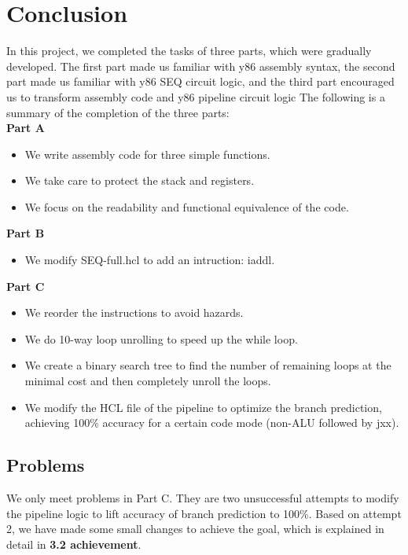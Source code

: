 \documentclass{article}
\begin{document}
\section{Conclusion}
In this project, we completed the tasks of three parts, 
which were gradually developed. The first part made us familiar with y86 assembly syntax, 
the second part made us familiar with y86 SEQ circuit logic, and the third part encouraged us to transform assembly code and y86 pipeline circuit logic
The following is a summary of the completion of the three parts:\\
\textbf{Part A}
\begin{itemize}
        \item We write assembly code for three simple functions.
        \item We take care to protect the stack and registers.
        \item We focus on the readability and functional equivalence of the code.
\end{itemize}
\textbf{Part B}
\begin{itemize}
        \item We modify SEQ-full.hcl to add an intruction: iaddl.
\end{itemize}
\textbf{Part C}
\begin{itemize}
        \item We reorder the instructions to avoid hazards.
        \item We do 10-way loop unrolling to speed up the while loop.
        \item We create a binary search tree to find the number of remaining loops at the minimal cost and then completely unroll the loops.
        \item We modify the HCL file of the pipeline to optimize the branch prediction,  achieving 100\% accuracy for a certain code mode (non-ALU followed by jxx).
\end{itemize}
\subsection{Problems}
We only meet problems in Part C. They are two unsuccessful attempts to modify the pipeline logic to lift accuracy of branch prediction to 100\%.
Based on attempt 2, we have made some small changes to achieve the goal, which is explained in detail in \textbf{3.2 achievement}.
\end{document}
